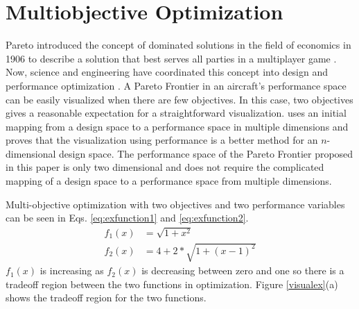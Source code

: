 \section{Multiobjective Optimization}
Pareto introduced the concept of dominated solutions in the field of economics in 1906 to describe a solution that best serves all parties in a multiplayer game \cite{paretomanual}. Now, science and engineering have coordinated this concept into design and performance optimization \cite{surveyMarler}. A Pareto Frontier in an aircraft's performance space can be easily visualized when there are few objectives. In this case, two objectives gives a reasonable expectation for a straightforward visualization. \cite{MultiobjectiveVisualization} uses an initial mapping from a design space to a performance space in multiple dimensions and proves that the visualization using performance is a better method for an $n$-dimensional design space. The performance space of the Pareto Frontier proposed in this paper is only two dimensional and does not require the complicated mapping of a design space to a performance space from multiple dimensions.\par
Multi-objective optimization with two objectives and two performance variables can be seen in Eqs. \ref{eq:exfunction1} and \ref{eq:exfunction2}.
\begin{align}
    f_1(x) &= \sqrt{1+x^2}\label{eq:exfunction1}\\
    f_2(x) &= 4+2*\sqrt{1+(x-1)^2}
    \label{eq:exfunction2}
\end{align}
$f_1(x)$ is increasing as $f_2(x)$ is decreasing between zero and one so there is a tradeoff region between the two functions in optimization. Figure \ref{visualex}(a) shows the tradeoff region for the two functions.

